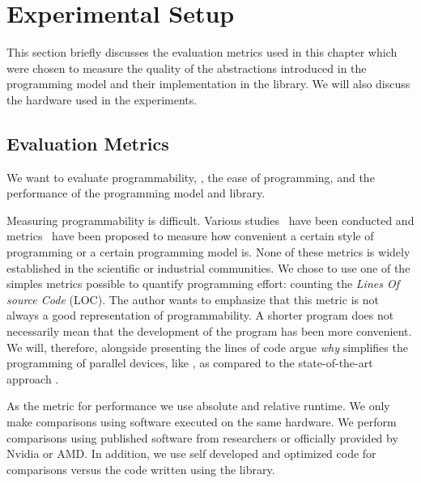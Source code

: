 \section{Experimental Setup}
\label{sec:skelcl:experimental_setup}
This section briefly discusses the evaluation metrics used in this chapter which were chosen to measure the quality of the abstractions introduced in the \SkelCL programming model and their implementation in the \SkelCL library.
We will also discuss the hardware used in the experiments.


\subsection{Evaluation Metrics}
We want to evaluate programmability, \ie, the ease of programming, and the performance of the \SkelCL programming model and library.

Measuring programmability is difficult.
Various studies~\cite{HochsteinCSAB2005,HochsteinBVG2008} have been conducted and metrics~\cite{VanderwielNL1997} have been proposed to measure how convenient a certain style of programming or a certain programming model is.
None of these metrics is widely established in the scientific or industrial communities.
We chose to use one of the simples metrics possible to quantify programming effort: counting the \emph{Lines Of source Code} (LOC).
The author wants to emphasize that this metric is not always a good representation of programmability.
A shorter program does not necessarily mean that the development of the program has been more convenient.
We will, therefore, alongside presenting the lines of code argue \emph{why} \SkelCL simplifies the programming of parallel devices, like \GPUs, as compared to the state-of-the-art approach \OpenCL.

As the metric for performance we use absolute and relative runtime.
We only make comparisons using software executed on the same hardware.
We perform comparisons using published software from researchers or officially provided by Nvidia or AMD.
In addition, we use self developed and optimized \OpenCL code for comparisons versus the code written using the \SkelCL library.

